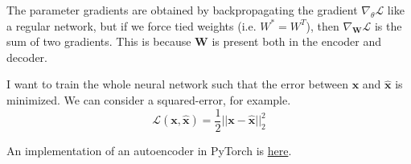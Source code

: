     The parameter gradients are obtained by backpropagating the gradient $\nabla_{\theta} \mathcal{L}$ like a regular network, but if we force tied weights (i.e. $W^\ast = W^T$), then $\nabla_{\mathbf{W}} \mathcal{L}$ is the sum of two gradients. This is because $\mathbf{W}$ is present both in the encoder and decoder. 

    I want to train the whole neural network such that the error between $\mathbf{x}$ and $\hat{\mathbf{x}}$ is minimized. We can consider a squared-error, for example. 
    \begin{equation}
      \mathcal{L}(\mathbf{x}, \hat{\mathbf{x}}) = \frac{1}{2} ||\mathbf{x} - \hat{\mathbf{x}}||_2^2
    \end{equation}

    \begin{algo}
      An implementation of an autoencoder in PyTorch is \href{code/autoencoder.html}{here}. 
    \end{algo}


